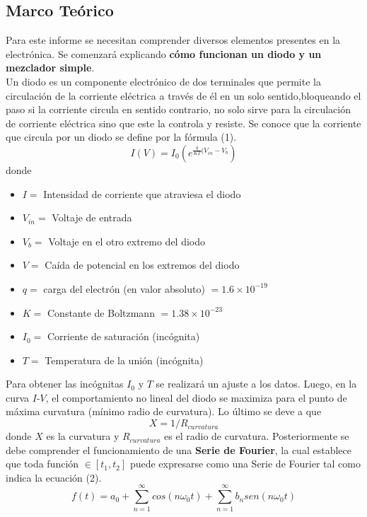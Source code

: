 \subsection{Marco Teórico}
Para este informe se necesitan comprender diversos elementos presentes en la electrónica. Se comenzará explicando \textbf{cómo funcionan un diodo y un mezclador simple}.\\
Un diodo es un componente electrónico de dos terminales que permite la circulación de la corriente eléctrica a través de él en un solo sentido, ​ bloqueando el paso si la corriente circula en sentido contrario, no solo sirve para la circulación de corriente eléctrica sino que este la controla y resiste. Se conoce que la corriente que circula por un diodo se define por la fórmula (1).\\
\begin{equation}
    I(V)=I_0\left(e^{\frac{q}{KT}(V_{in}-V_b}\right)
\end{equation}
donde
\begin{itemize}
    \item $I =$ Intensidad de corriente que atraviesa el diodo
    \item $V_{in} =$ Voltaje de entrada
    \item $V_b =$ Voltaje en el otro extremo del diodo
    \item $V =$ Caída de potencial en los extremos del diodo
    \item $q = $ carga del electrón (en valor absoluto) $= 1.6 \times 10^{-19}$
    \item $K = $ Constante de Boltzmann $= 1.38\times 10^{-23}$
    \item $I_0 =$ Corriente de saturación (incógnita)
    \item $T =$ Temperatura de la unión (incógnita)
\end{itemize}
Para obtener las incógnitas $I_0$ y $T$ se realizará un ajuste a los datos. Luego, en la curva $I$-$V$, el comportamiento no lineal del diodo se maximiza para el punto de máxima curvatura (mínimo radio de curvatura). Lo último se deve a que
$$X=1/R_{curvatura}$$
donde $X$ es la curvatura y $R_{curvatura}$ es el radio de curvatura.
Posteriormente se debe comprender el funcionamiento de una \textbf{Serie de Fourier}, la cual establece que toda función $\in [t_1, t_2]$ puede expresarse como una Serie de Fourier tal como indica la ecuación (2).
\begin{equation}
    f(t)=a_0+\sum\limits_{n=1}^\infty cos(n\omega_0t)+\sum\limits_{n=1}^\infty b_nsen(n\omega_0t)
\end{equation}
